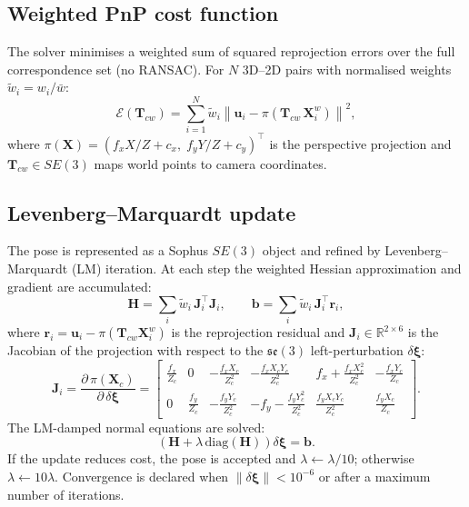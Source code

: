 \documentclass[11pt,a4paper]{article}
\begin{document}
\subsection{Weighted PnP cost function}

The solver minimises a weighted sum of squared reprojection errors over the
full correspondence set (no RANSAC). For $N$ 3D--2D pairs with normalised
weights $\tilde{w}_i = w_i / \bar{w}$:
\[
  \mathcal{E}(\mathbf{T}_{cw}) =
  \sum_{i=1}^{N} \tilde{w}_i
  \left\| \mathbf{u}_i - \pi\!\left(\mathbf{T}_{cw}\,\mathbf{X}_i^w\right)
  \right\|^2,
\]
where $\pi(\mathbf{X}) = (f_x X/Z + c_x,\; f_y Y/Z + c_y)^\top$ is the
perspective projection and $\mathbf{T}_{cw} \in SE(3)$ maps world points to
camera coordinates.

\subsection{Levenberg--Marquardt update}

The pose is represented as a Sophus $SE(3)$ object and refined by
Levenberg--Marquardt (LM) iteration. At each step the weighted Hessian
approximation and gradient are accumulated:
\[
  \mathbf{H} = \sum_i \tilde{w}_i\,\mathbf{J}_i^\top \mathbf{J}_i,
  \qquad
  \mathbf{b} = \sum_i \tilde{w}_i\,\mathbf{J}_i^\top \mathbf{r}_i,
\]
where $\mathbf{r}_i = \mathbf{u}_i - \pi(\mathbf{T}_{cw}\mathbf{X}_i^w)$ is
the reprojection residual and $\mathbf{J}_i \in \mathbb{R}^{2 \times 6}$ is
the Jacobian of the projection with respect to the $\mathfrak{se}(3)$
left-perturbation $\delta\boldsymbol{\xi}$:
\[
  \mathbf{J}_i = \frac{\partial\,\pi(\mathbf{X}_c)}{\partial\,\delta\boldsymbol{\xi}}
  = \begin{bmatrix}
      \tfrac{f_x}{Z_c} & 0 & -\tfrac{f_x X_c}{Z_c^2} &
      -\tfrac{f_x X_c Y_c}{Z_c^2} & f_x + \tfrac{f_x X_c^2}{Z_c^2} & -\tfrac{f_x Y_c}{Z_c} \\[4pt]
      0 & \tfrac{f_y}{Z_c} & -\tfrac{f_y Y_c}{Z_c^2} &
      -f_y - \tfrac{f_y Y_c^2}{Z_c^2} & \tfrac{f_y X_c Y_c}{Z_c^2} & \tfrac{f_y X_c}{Z_c}
    \end{bmatrix}.
\]
The LM-damped normal equations are solved:
\[
  \left(\mathbf{H} + \lambda\,\mathrm{diag}(\mathbf{H})\right)\delta\boldsymbol{\xi}
  = \mathbf{b}.
\]
If the update reduces cost, the pose is accepted and $\lambda \leftarrow
\lambda/10$; otherwise $\lambda \leftarrow 10\lambda$. Convergence is declared
when $\|\delta\boldsymbol{\xi}\| < 10^{-6}$ or after a maximum number of
iterations.
\end{document}
